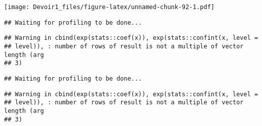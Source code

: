\documentclass[]{article}
\newenvironment{Shaded}{\begin{snugshade}}{\end{snugshade}}
\newcommand{\KeywordTok}[1]{\textcolor[rgb]{0.13,0.29,0.53}{\textbf{#1}}}
\newcommand{\DataTypeTok}[1]{\textcolor[rgb]{0.13,0.29,0.53}{#1}}
\newcommand{\DecValTok}[1]{\textcolor[rgb]{0.00,0.00,0.81}{#1}}
\newcommand{\StringTok}[1]{\textcolor[rgb]{0.31,0.60,0.02}{#1}}
\newcommand{\OperatorTok}[1]{\textcolor[rgb]{0.81,0.36,0.00}{\textbf{#1}}}
\newcommand{\NormalTok}[1]{#1}
\begin{document}
\texttt{[image: Devoir1\_files/figure-latex/unnamed-chunk-92-1.pdf]}

\begin{Shaded}
\end{Shaded}

\begin{verbatim}
## Waiting for profiling to be done...
\end{verbatim}

\begin{verbatim}
## Warning in cbind(exp(stats::coef(x)), exp(stats::confint(x, level =
## level)), : number of rows of result is not a multiple of vector length (arg
## 3)
\end{verbatim}

\begin{verbatim}
## Waiting for profiling to be done...
\end{verbatim}

\begin{verbatim}
## Warning in cbind(exp(stats::coef(x)), exp(stats::confint(x, level =
## level)), : number of rows of result is not a multiple of vector length (arg
## 3)
\end{verbatim}
\end{document}
